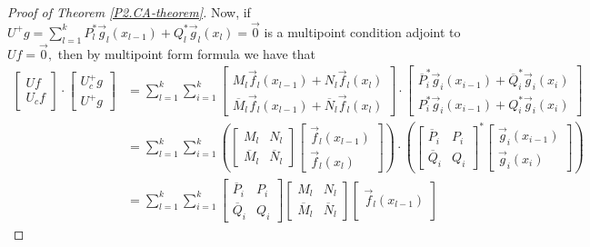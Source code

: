 \documentclass[10pt,reqno,oneside,a4paper]{article}
\begin{document}
\begin{proof}[Proof of Theorem \ref{P2.CA-theorem}]
Now, if $U^+g = \sum^k_{l=1} P^*_l \vec{g}_l(x_{l-1}) + Q^*_l \vec{g}_l(x_l) = \vec{0}$ is a multipoint condition adjoint to $Uf = \vec{0},$ then by multipoint form formula we have that 
\begin{align}
\begin{bmatrix}
Uf \\
U_c f
\end{bmatrix} \cdot 
\begin{bmatrix}
U^+_cg \\
U^+ g
\end{bmatrix} 
&= 
\sum^k_{l=1} \sum^k_{i=1} 
\begin{bmatrix}
M_l  \vec{f}_l(x_{l-1}) + N_l \vec{f}_l(x_l) \\
\overline{M}_l \vec{f}_l(x_{l-1}) +\overline{N}_l \vec{f}_l(x_l) 
\end{bmatrix} \cdot 
\begin{bmatrix}
\overline{P}^*_i \vec{g}_i(x_{i-1}) + \overline{Q}^*_i \vec{g}_i(x_i) \\
P^*_i \vec{g}_i(x_{i-1}) + Q^*_i \vec{g}_i(x_i) 
\end{bmatrix} \nonumber \\
&= 
\sum^k_{l=1} \sum^k_{i=1} \left(
\begin{bmatrix}
M_l & N_l  \\
\overline{M}_l & \overline{N}_l 
\end{bmatrix} 
\begin{bmatrix}
\vec{f}_l(x_{l-1}) \\
\vec{f}_l(x_l) 
\end{bmatrix} 
\right)
\cdot 
\left(
\begin{bmatrix}
\overline{P}_i & P_i \\
\overline{Q}_i & Q_i
\end{bmatrix}^*
\begin{bmatrix}
\vec{g}_i(x_{i-1}) \\
\vec{g}_i(x_i) 
\end{bmatrix}\right) \nonumber \\
&=
\sum^k_{l=1} \sum^k_{i=1} 
\begin{bmatrix}
\overline{P}_i & P_i \\
\overline{Q}_i & Q_i
\end{bmatrix} 
\begin{bmatrix}
M_l & N_l  \\
\overline{M}_l & \overline{N}_l 
\end{bmatrix} 
\begin{bmatrix}
\vec{f}_l(x_{l-1}) \\

\end{bmatrix}
\end{align}
\end{proof}
\end{document}
